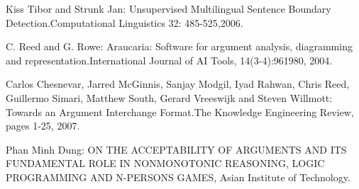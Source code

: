 \documentclass[lnbip]{svmultln}
\begin{document}
\begin{thebibliography}{5}
Kiss Tibor and Strunk Jan: Unsupervised Multilingual Sentence Boundary Detection.Computational Linguistics 32: 485-525,2006.

C. Reed and G. Rowe: Araucaria: Software for argument analysis, diagramming and representation.International Journal of AI Tools, 14(3-4):961{980, 2004}.

Carlos Chesnevar, Jarred McGinnis, Sanjay Modgil, Iyad Rahwan, Chris Reed, Guillermo Simari, Matthew South, Gerard Vreeswijk and Steven Willmott: Towards an Argument Interchange Format.The Knowledge Engineering Review, pages 1-25, 2007.

Phan Minh Dung: ON THE ACCEPTABILITY OF ARGUMENTS AND ITS FUNDAMENTAL ROLE IN NONMONOTONIC REASONING, LOGIC PROGRAMMING AND N-PERSONS GAMES, Asian Institute of Technology.

\end{thebibliography}
\end{document}
